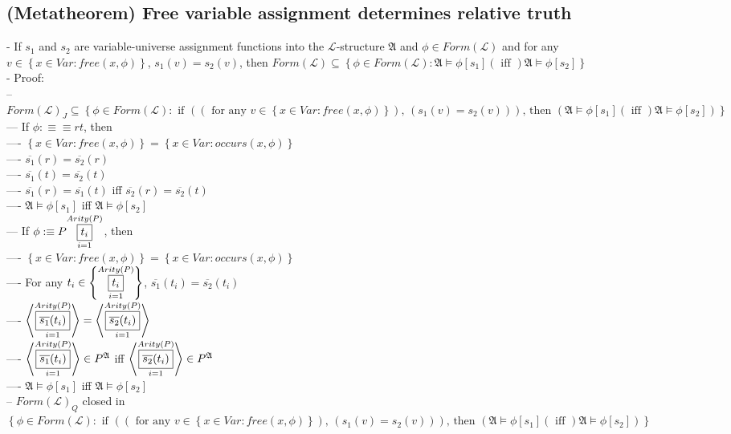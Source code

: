 \documentclass{book}
\newcommand{\is}{:\equiv}
\newcommand{\txtiff}{\left(\text{ iff }\right)}
\newcommand{\txtforall}[2]{\left(\text{ for any }#1\right)\text{, }\left(#2\right)}
\newcommand{\txtif}[2]{\text{ if }\left(#1\right)\text{, then }\left(#2\right)}
\newcommand{\occurs}[2]{occurs(#1, #2)}
\newcommand{\free}[2]{free(#1, #2)}
\newcommand{\means}[2]{#1^{#2}}
\newcommand{\extend}[1]{\overline{#1}}
\newcommand{\set}[1]{\left\{ #1 \right\}}
\newcommand{\seq}[1]{\left\langle #1 \right\rangle}
\newcommand{\vdc}[3]{\underset{#2}{\overset{#3}{\fbox{$#1$}}}}
\begin{document}
\subsection{(Metatheorem) Free variable assignment determines relative truth} %
	- If $s_1$ and $s_2$ are variable-universe assignment functions into the $\mathcal{L}$-structure $\mathfrak{A}$ and $\phi \in Form(\mathcal{L})$ and for any $v \in \set{x \in Var: \free{x}{\phi}}$, $s_1(v) = s_2(v)$, then $Form(\mathcal{L}) \subseteq \set{\phi \in Form(\mathcal{L}): \mathfrak{A} \vDash \phi[s_1] \txtiff \mathfrak{A} \vDash \phi[s_2]}$ \\
	- Proof: \\
		-- $Form(\mathcal{L})_J \subseteq \set{\phi \in Form(\mathcal{L}): \txtif{\txtforall{v \in \set{x \in Var: \free{x}{\phi}}}{s_1(v) = s_2(v)}}{\mathfrak{A} \vDash \phi[s_1] \txtiff \mathfrak{A} \vDash \phi[s_2]}}$ \\
			--- If $\phi \is \equiv r t$, then \\
				---- $\set{x \in Var: \free{x}{\phi}} = \set{x \in Var: \occurs{x}{\phi}}$ \\
				---- $\extend{s_1}(r) = \extend{s_2}(r)$ \\
				---- $\extend{s_1}(t) = \extend{s_2}(t)$ \\
				---- $\extend{s_1}(r) = \extend{s_1}(t)$ iff $\extend{s_2}(r) = \extend{s_2}(t)$ \\
				---- $\mathfrak{A} \vDash \phi[s_1]$ iff $\mathfrak{A} \vDash \phi[s_2]$ \\
			--- If $\phi \is P \vdc{t_i}{i=1}{Arity(P)}$, then \\
				---- $\set{x \in Var: \free{x}{\phi}} = \set{x \in Var: \occurs{x}{\phi}}$ \\
				---- For any $t_i \in \set{\vdc{t_i}{i=1}{Arity(P)}}$, $\extend{s_1}(t_i) = \extend{s_2}(t_i)$ \\
				---- $\seq{\vdc{\extend{s_1}(t_i)}{i=1}{Arity(P)}} = \seq{\vdc{\extend{s_2}(t_i)}{i=1}{Arity(P)}}$ \\
				---- $\seq{\vdc{\extend{s_1}(t_i)}{i=1}{Arity(P)}} \in \means{P}{\mathfrak{A}}$ iff $\seq{\vdc{\extend{s_2}(t_i)}{i=1}{Arity(P)}} \in \means{P}{\mathfrak{A}}$ \\
				---- $\mathfrak{A} \vDash \phi[s_1]$ iff $\mathfrak{A} \vDash \phi[s_2]$ \\
		-- $Form(\mathcal{L})_Q$ closed in $\set{\phi \in Form(\mathcal{L}): \txtif{\txtforall{v \in \set{x \in Var: \free{x}{\phi}}}{s_1(v) = s_2(v)}}{\mathfrak{A} \vDash \phi[s_1] \txtiff \mathfrak{A} \vDash \phi[s_2]}}$ \\
\end{document}
